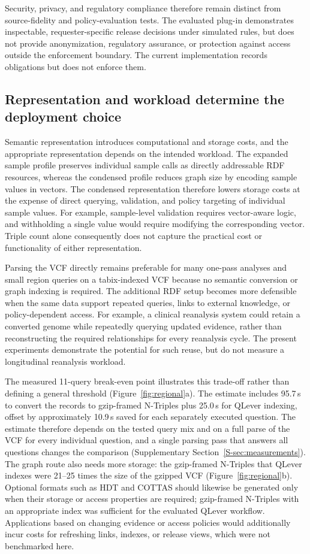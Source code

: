 \documentclass[pdflatex,sn-mathphys-num]{sn-jnl}
\begin{document}
Security, privacy, and regulatory compliance therefore remain distinct from source-fidelity and policy-evaluation tests.
The evaluated plug-in demonstrates inspectable, requester-specific release decisions under simulated rules, but does not provide anonymization, regulatory assurance, or protection against access outside the enforcement boundary.
The current implementation records obligations but does not enforce them.

\subsection{Representation and workload determine the deployment choice}\label{subsec:disc-deployment}
Semantic representation introduces computational and storage costs, and the appropriate representation depends on the intended workload.
The expanded sample profile preserves individual sample calls as directly addressable RDF resources, whereas the condensed profile reduces graph size by encoding sample values in vectors.
The condensed representation therefore lowers storage costs at the expense of direct querying, validation, and policy targeting of individual sample values.
For example, sample-level validation requires vector-aware logic, and withholding a single value would require modifying the corresponding vector.
Triple count alone consequently does not capture the practical cost or functionality of either representation.

Parsing the VCF directly remains preferable for many one-pass analyses and small region queries on a tabix-indexed VCF because no semantic conversion or graph indexing is required.
The additional RDF setup becomes more defensible when the same data support repeated queries, links to external knowledge, or policy-dependent access.
For example, a clinical reanalysis system could retain a converted genome while repeatedly querying updated evidence, rather than reconstructing the required relationships for every reanalysis cycle.
The present experiments demonstrate the potential for such reuse, but do not measure a longitudinal reanalysis workload.

The measured 11-query break-even point illustrates this trade-off rather than defining a general threshold (Figure~\ref{fig:regional}a).
The estimate includes 95.7\,s to convert the records to gzip-framed N-Triples plus 25.0\,s for QLever indexing, offset by approximately 10.9\,s saved for each separately executed question.
The estimate therefore depends on the tested query mix and on a full parse of the VCF for every individual question, and a single parsing pass that answers all questions changes the comparison (Supplementary Section~\ref{S-sec:measurements}).
The graph route also needs more storage: the gzip-framed N-Triples that QLever indexes were 21--25 times the size of the gzipped VCF (Figure~\ref{fig:regional}b).
Optional formats such as HDT and COTTAS should likewise be generated only when their storage or access properties are required; gzip-framed N-Triples with an appropriate index was sufficient for the evaluated QLever workflow.
Applications based on changing evidence or access policies would additionally incur costs for refreshing links, indexes, or release views, which were not benchmarked here.
\end{document}
